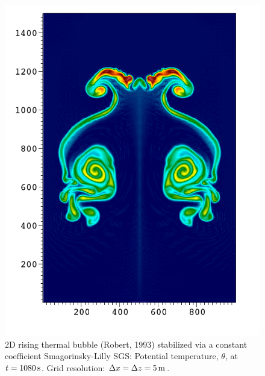 \documentclass{article}
\begin{document}
\begin{figure}[htbp]
\includegraphics[width=\textwidth]{figures/RTB-Robert--smgo-5mX5m-1080s0000.png}
\caption{2D rising thermal bubble (Robert, 1993) stabilized via a constant coefficient Smagorinsky-Lilly SGS: Potential temperature, $\theta$, at $t=1080\,{\rm s}$. Grid resolution: $\Delta x = \Delta z = 5\,{\rm m}$.}
\label{fig:benchmarks/robert5msmago}
\end{figure}
\end{document}
